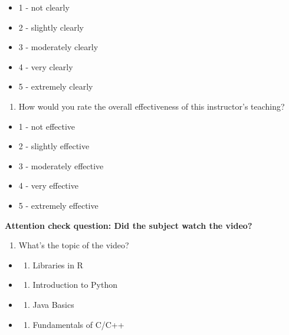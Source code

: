 \documentclass[
]{article}
\providecommand{\tightlist}{%
  \setlength{\itemsep}{0pt}\setlength{\parskip}{0pt}}
\begin{document}
\begin{itemize}
\tightlist
\item
  1 - not clearly
\item
  2 - slightly clearly
\item
  3 - moderately clearly
\item
  4 - very clearly
\item
  5 - extremely clearly
\end{itemize}

\begin{enumerate}
\def\labelenumi{\arabic{enumi}.}
\setcounter{enumi}{4}
\tightlist
\item
  How would you rate the overall effectiveness of this instructor's
  teaching?
\end{enumerate}

\begin{itemize}
\tightlist
\item
  1 - not effective
\item
  2 - slightly effective
\item
  3 - moderately effective
\item
  4 - very effective
\item
  5 - extremely effective
\end{itemize}

\textbf{Attention check question: Did the subject watch the video?}

\begin{enumerate}
\def\labelenumi{\arabic{enumi}.}
\tightlist
\item
  What's the topic of the video?
\end{enumerate}

\begin{itemize}
\item
  \begin{enumerate}
  \def\labelenumi{\alph{enumi}.}
  \tightlist
  \item
    Libraries in R
  \end{enumerate}
\item
  \begin{enumerate}
  \def\labelenumi{\alph{enumi}.}
  \setcounter{enumi}{1}
  \tightlist
  \item
    Introduction to Python
  \end{enumerate}
\item
  \begin{enumerate}
  \def\labelenumi{\alph{enumi}.}
  \setcounter{enumi}{2}
  \tightlist
  \item
    Java Basics
  \end{enumerate}
\item
  \begin{enumerate}
  \def\labelenumi{\alph{enumi}.}
  \setcounter{enumi}{3}
  \tightlist
  \item
    Fundamentals of C/C++
  \end{enumerate}
\end{itemize}
\end{document}
